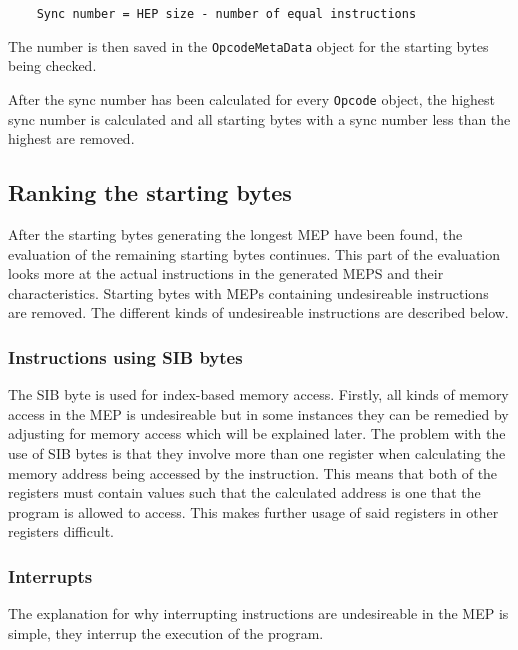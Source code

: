 \documentclass[11pt,twoside]{eitExjobb}
\begin{document}
\begin{verbatim}
    Sync number = HEP size - number of equal instructions
\end{verbatim}

The number is then saved in the \texttt{OpcodeMetaData} object for the starting bytes being checked.

After the sync number has been calculated for every \texttt{Opcode} object, the highest sync number is calculated and all starting bytes with a sync number less than the highest are removed.


\subsection{Ranking the starting bytes}
After the starting bytes generating the longest MEP have been found, the evaluation of the remaining starting bytes continues. This part of the evaluation looks more at the actual instructions in the generated MEPS and their characteristics. Starting bytes with MEPs containing undesireable instructions are removed. The different kinds of undesireable instructions are described below.

\subsubsection{Instructions using SIB bytes}
The SIB byte is used for index-based memory access. Firstly, all kinds of memory access in the MEP is undesireable but in some instances they can be remedied by adjusting for memory access which will be explained later. The problem with the use of SIB bytes is that they involve more than one register when calculating the memory address being accessed by the instruction. This means that both of the registers must contain values such that the calculated address is one that the program is allowed to access. This makes further usage of said registers in other registers difficult.

\subsubsection{Interrupts}
The explanation for why interrupting instructions are undesireable in the MEP is simple, they interrup the execution of the program. \\
\end{document}
